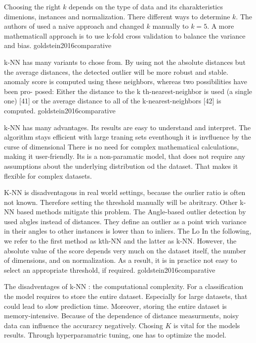 Choosing the right $k$ depends on the type of data and its charakteristics dimenions, instances and normalization.
There different ways to determine $k$. 
The authors of \citet{shenkar2022anomaly} used a naive approach and changed $k$ manually to $k=5$.
A more mathematicall approach is to use k-fold cross validation to balance the variance and bias.
goldstein2016comparative

k-NN has many variants to chose from. 
By using not the absolute distances but the average distances, the detected outlier will be more robust and stable. \citep{angiulli2002fast}
anomaly score is computed using these neighbors, whereas two possibilities have been pro-
posed: Either the distance to the k th-nearest-neighbor is used (a single one) [41] or the average
distance to all of the k-nearest-neighbors [42] is computed. goldstein2016comparative

k-NN has many advantages. Its results are easy to understand and interpret.
The algorithm stays efficient with large traning sets eventhough it is invfluence by the curse of dimensional
There is no need for complex mathematical calculations, making it user-friendly.
Its is a non-paramatic model, that does not require any assumptions about the underlying distribution od the dataset.
That makes it flexible for complex datasets.


K-NN is disadventagous in real world settings, because the ourlier ratio is often not known.
Therefore setting the threshold manually will be abritrary.
Other k-NN based methods mitigate this problem.
The Angle-based outlier detection by \citet{kriegel2008angle} used abgles instead of distances.
They define an outlier as a point wich variance in their angles to other instances is lower than to inliers.
The Lo
In the following, we refer to the
first method as kth-NN and the latter as k-NN.  However, the absolute value of the score depends very much on the
dataset itself, the number of dimensions, and on normalization. As a result, it is in practice not
easy to select an appropriate threshold, if required. goldstein2016comparative


The disadventages of k-NN : the computational complexity. 
For a classification the model requires to store the entire dataset. Especially for large datasets, that could lead to slow prediction time. 
Moreover, storing the entire dataset is memory-intensive.
Because of the dependence of distance measurments, noisy data can influence the accurarcy negatively.
Chosing $K$ is vital for the models results. Through hyperparamatric tuning, one has to optimize the model. 



